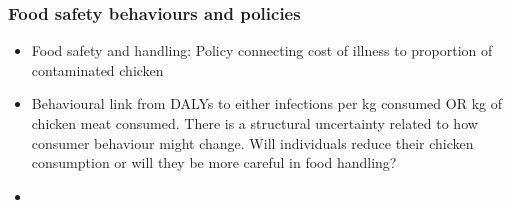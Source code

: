 \subsubsection{Food safety behaviours and policies}

\begin{itemize}
    \item Food safety and handling: Policy connecting cost of illness to proportion of contaminated chicken
    \item Behavioural link from DALYs to either infections per kg consumed OR kg of chicken meat consumed. There is a structural uncertainty related to how consumer behaviour might change. Will individuals reduce their chicken consumption or will they be more careful in food handling?
    \item 
\end{itemize}